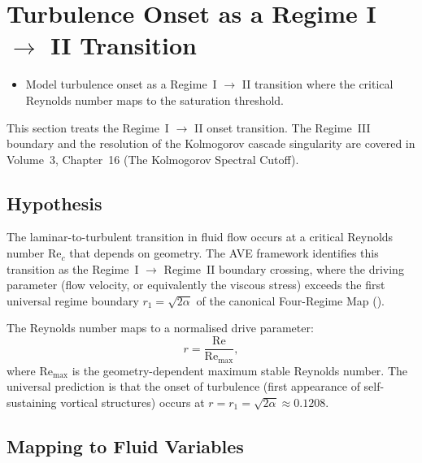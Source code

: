 \section{Turbulence Onset as a Regime I \texorpdfstring{$\to$}{to} II Transition}
\label{sec:turbulence_onset}

\begin{objectivebox}
\begin{itemize}
    \item Model turbulence onset as a Regime~I $\to$ II transition where the critical Reynolds number maps to the saturation threshold.
\end{itemize}
\end{objectivebox}

This section treats the Regime~I $\to$ II onset transition. The Regime~III boundary and the resolution of the Kolmogorov cascade singularity are covered in Volume~3, Chapter~16 (The Kolmogorov Spectral Cutoff).

\subsection{Hypothesis}

The laminar-to-turbulent transition in fluid flow occurs at a
critical Reynolds number $\mathrm{Re}_c$ that depends on geometry.
The AVE framework identifies this transition as the Regime~I $\to$
Regime~II boundary crossing, where the driving parameter (flow
velocity, or equivalently the viscous stress) exceeds the first
universal regime boundary $r_1 = \sqrt{2\alpha}$ of the canonical
Four-Regime Map ().

The Reynolds number maps to a normalised drive parameter:
\begin{equation}
  r = \frac{\mathrm{Re}}{\mathrm{Re}_{\max}},
\end{equation}
where $\mathrm{Re}_{\max}$ is the geometry-dependent maximum
stable Reynolds number.  The universal prediction is that the
onset of turbulence (first appearance of self-sustaining vortical
structures) occurs at $r = r_1 = \sqrt{2\alpha} \approx 0.1208$.

\subsection{Mapping to Fluid Variables}


